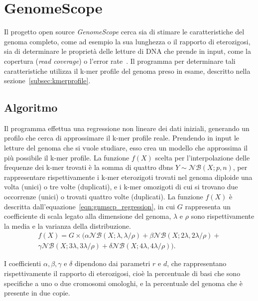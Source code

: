 \documentclass[crop=false, class=book]{standalone}
\begin{document}
	\section{GenomeScope}
	
	Il progetto open source \textit{GenomeScope} cerca sia di stimare le caratteristiche del genoma completo, come ad esempio la sua lunghezza o il rapporto di eterozigosi, sia di determinare le proprietà delle letture di DNA che prende in input, come la copertura (\textit{read coverage}) o l'error rate~\cite{vurture2017genomescope}. Il programma per determinare tali caratteristiche utilizza il k-mer profile del genoma preso in esame, descritto nella sezione~\vref{subsec:kmerprofile}.
		

	\subsection{Algoritmo}
	Il programma effettua una regressione non lineare dei dati iniziali, generando un profilo che cerca di approssimare il k-mer profile reale. Prendendo in input le letture del genoma che si vuole studiare, esso crea un modello che approssima il più possibile il k-mer profile. La funzione $f(X)$ scelta per l'interpolazione delle frequenze dei k-mer trovati è la somma di quattro \glspl{dbn} $Y \sim \mathcal{NB}(X;p,n)$, per rappresentare rispettivamente i k-mer eterozigoti trovati nel genoma diploide una volta (unici) o tre volte (duplicati), e i k-mer omozigoti di cui si trovano due occorrenze (unici) o trovati quattro volte (duplicati). La funzione $f(X)$ è descritta dall'equazione~\vref{eqn:gnmscp_regression}, in cui $G$ rappresenta un coefficiente di scala legato alla dimensione del genoma, $\lambda$ e $\rho$ sono rispettivamente la media e la varianza della distribuzione. 
	\begin{multline}
		f(X) = G \times (\alpha \mathcal{NB}(X;\lambda, \lambda/\rho) + \beta \mathcal{NB}(X;2\lambda, 2\lambda/\rho) + \\
		\gamma \mathcal{NB}(X;3\lambda, 3\lambda/\rho) + \delta \mathcal{NB}(X;4\lambda, 4\lambda/\rho)  ).	
		\label{eqn:gnmscp_regression}
	\end{multline}

	I coefficienti $\alpha, \beta, \gamma$ e $\delta$ dipendono dai parametri $r$ e $d$, che rappresentano rispettivamente il rapporto di eterozigosi, cioè la percentuale di basi che sono specifiche a uno o due cromosomi omologhi, e la percentuale del genoma che è presente in due copie.
	
\end{document}
